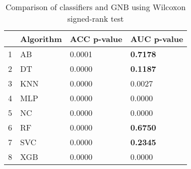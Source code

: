 \begin{table}
\footnotesize
\caption{Comparison of classifiers and GNB using Wilcoxon signed-rank test}
\label{tab:wilcoxon comparison}
\begin{tabular}{llll}
\hline
 & Algorithm & ACC p-value & AUC p-value \\
\hline
1 & AB & 0.0001 & \textbf{0.7178} \\
2 & DT & 0.0000 & \textbf{0.1187} \\
3 & KNN & 0.0000 & 0.0027 \\
4 & MLP & 0.0000 & 0.0000 \\
5 & NC & 0.0000 & 0.0000 \\
6 & RF & 0.0000 & \textbf{0.6750} \\
7 & SVC & 0.0000 & \textbf{0.2345} \\
8 & XGB & 0.0000 & 0.0000 \\
\hline
\end{tabular}
\end{table}
